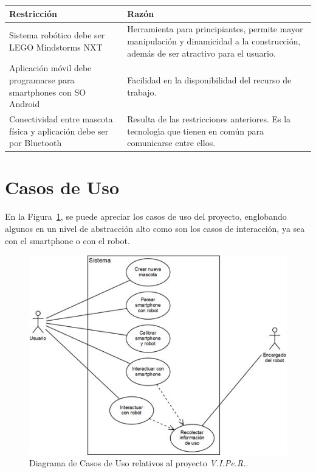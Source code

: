 \documentclass[letterpaper,12pt]{article} %
\numberwithin{equation}{section} %
\numberwithin{figure}{section} %
\numberwithin{table}{section} %
\begin{document}
\begin{table}[H]
  \centering
  \begin{tabular}{p{5cm}p{9cm}}\hline
    Restricci\'on & Raz\'on \\ \hline\hline %
    Sistema rob\'otico debe ser LEGO Mindstorms NXT & Herramienta para principiantes, permite mayor manipulaci\'on y dinamicidad a la construcci\'on, adem\'as de ser atractivo para el usuario.\\ \hline
    Aplicaci\'on m\'ovil debe programarse para smartphones con SO Android & Facilidad en la disponibilidad del recurso de trabajo. \\ \hline
    Conectividad entre mascota f\'isica y aplicaci\'on debe ser por Bluetooth & Resulta de las restricciones anteriores. Es la tecnolog\'{\i}a que tienen en com\'un para comunicarse entre ellos.\\ \hline \hline
  \end{tabular}
\end{table}

\newpage
\section{Casos de Uso} %

En la Figura~\ref{fig:CasoUso}, se puede apreciar los casos de uso del proyecto, englobando algunos en un nivel de abstracci\'on alto como son los casos de interacci\'on, ya sea con el smartphone o con el robot.\\

\begin{figure}[H]
   \centering
     \includegraphics[scale=1]{CasoUso.jpg}
   \caption{Diagrama de Casos de Uso relativos al proyecto \emph{V.I.Pe.R.}.}
   \label{fig:CasoUso}
\end{figure}
\end{document}
